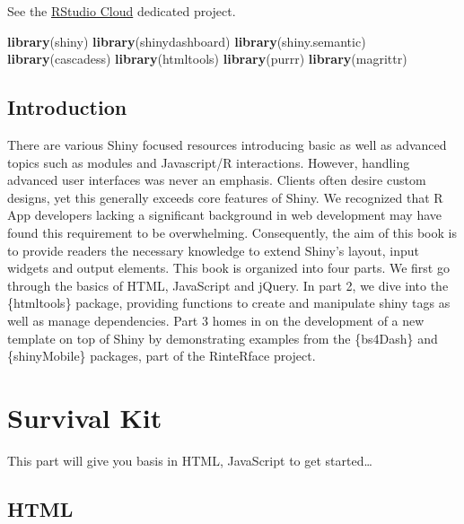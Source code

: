 \documentclass[]{book}
\newenvironment{Shaded}{\begin{snugshade}}{\end{snugshade}}
\newcommand{\KeywordTok}[1]{\textcolor[rgb]{0.13,0.29,0.53}{\textbf{#1}}}
\newcommand{\NormalTok}[1]{#1}
\begin{document}
See the \href{https://rstudio.cloud}{RStudio Cloud} dedicated project.

\begin{Shaded}
\begin{Highlighting}[]
\KeywordTok{library}\NormalTok{(shiny)}
\KeywordTok{library}\NormalTok{(shinydashboard)}
\KeywordTok{library}\NormalTok{(shiny.semantic)}
\KeywordTok{library}\NormalTok{(cascadess)}
\KeywordTok{library}\NormalTok{(htmltools)}
\KeywordTok{library}\NormalTok{(purrr)}
\KeywordTok{library}\NormalTok{(magrittr)}
\end{Highlighting}
\end{Shaded}

\hypertarget{intro}{%
\chapter{Introduction}\label{intro}}

There are various Shiny focused resources introducing basic as well as advanced topics such as modules and Javascript/R interactions. However, handling advanced user interfaces was never an emphasis. Clients often desire custom designs, yet this generally exceeds core features of Shiny. We recognized that R App developers lacking a significant background in web development may have found this requirement to be overwhelming. Consequently, the aim of this book is to provide readers the necessary knowledge to extend Shiny's layout, input widgets and output elements. This book is organized into four parts. We first go through the basics of HTML, JavaScript and jQuery. In part 2, we dive into the \{htmltools\} package, providing functions to create and manipulate shiny tags as well as manage dependencies. Part 3 homes in on the development of a new template on top of Shiny by demonstrating examples from the \{bs4Dash\} and \{shinyMobile\} packages, part of the RinteRface project.

\hypertarget{part-survival-kit}{%
\part*{Survival Kit}\label{part-survival-kit}}

This part will give you basis in HTML, JavaScript to get started\ldots{}

\hypertarget{survival-kit-html}{%
\chapter{HTML}\label{survival-kit-html}}
\end{document}
